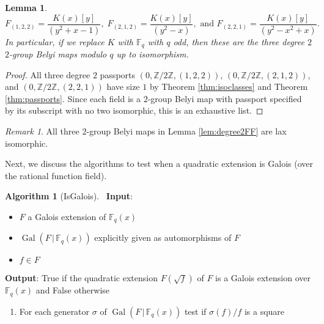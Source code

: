 \documentclass{dcthesis}
\newcommand{\ZZ}{\mathbb Z}
\newcommand{\FF}{\mathbb{F}}
\DeclareMathOperator{\Gal}{Gal}
\numberwithin{equation}{section}
\newtheorem{lemma}[equation]{Lemma}
\theoremstyle{definition}
\newtheorem{alg}[equation]{Algorithm}
\theoremstyle{remark}
\newtheorem{remark}[equation]{Remark}
\begin{document}
{{{\begin{lemma}
\begin{equation}
        F_{(1,2,2)} =
        \frac{K(x)[y]}{(y^2 + x - 1)},\;
        F_{(2,1,2)} =
        \frac{K(x)[y]}{(y^2 - x)},
        \text{ and }
        F_{(2,2,1)} =
        \frac{K(x)[y]}{(y^2 - x^2 + x)}.
      \end{equation}
      In particular,
      if we replace $K$ with $\FF_q$ with $q$ odd,
      then these are the three degree $2$
      $2$-group Belyi maps
      modulo $q$ up to isomorphism.
    \end{lemma}
    \begin{proof}
      All three degree $2$ passports
      $(0,\ZZ/2\ZZ,(1,2,2))$,
      $(0,\ZZ/2\ZZ,(2,1,2))$, and
      \newline
      $(0,\ZZ/2\ZZ,(2,2,1))$
      have size $1$ by
      Theorem
      \ref{thm:isoclasses}
      and Theorem
      \ref{thm:passports}.
      Since each field is a
      $2$-group Belyi map
      with passport specified
      by its subscript
      with no two isomorphic,
      this is an exhaustive list.
    \end{proof}
    \begin{remark}
      \label{rmk:degree2FFlax}
      All three $2$-group Belyi maps
      in Lemma
      \ref{lem:degree2FF}
      are lax isomorphic.
    \end{remark}
    Next, we discuss the algorithms
    to test when a quadratic extension
    is Galois (over the rational function field).
    \begin{alg}[IsGalois]
      \label{alg:isgalois}
      \,
      \newline
      \textbf{Input}:
      \begin{itemize}
        \item
          $F$ a Galois extension of
          $\FF_q(x)$
        \item
          $\Gal(F\,|\,\FF_q(x))$
          explicitly given
          as automorphisms of $F$
        \item
          $f\in F$
      \end{itemize}
      \textbf{Output}:
      \textsf{True} if the quadratic extension
      $F(\sqrt{f})$ of $F$
      is a Galois extension over $\FF_q(x)$
      and \textsf{False} otherwise
      \begin{enumerate}
        \item
          For each generator
          $\sigma$ of $\Gal(F\,|\,\FF_q(x))$
          test if $\sigma(f)/f$ is a square

\end{enumerate}
\end{alg}}}}
\end{document}
